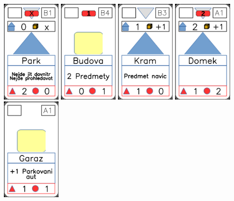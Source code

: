 \documentclass[a4paper]{article}
\begin{document}
	\includegraphics[width=3.0cm]{img-3_20}
	\includegraphics[width=3.0cm]{img-2_8}
	\includegraphics[width=3.0cm]{img-3_7}
	\includegraphics[width=3.0cm]{img-3_0}
	\includegraphics[width=3.0cm]{img-2_15}
\end{document}
